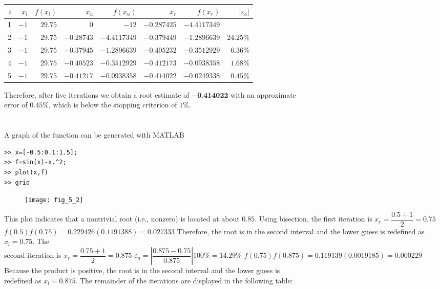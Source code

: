 \documentclass[../main.tex]{subfiles}
\begin{document}
\begin{enumerate}[label=\bfseries(\alph*)]
\begin{tabular}{|r|r|r|r|r|r|r|r|}
\hline
$i$ & $x_{l}$ & $f\left(x_{l}\right)$ & $x_{u}$ & $f\left(x_{u}\right)$ & $x_{r}$ & $f\left(x_{r}\right)$ & $\left|\varepsilon_{a}\right|$ \\
\hline
1 & $-1$ & $29.75$ & 0 & $-12$ & $-0.287425$ & $-4.4117349$ &  \\
\hline
2 & $-1$ & $29.75$ & $-0.28743$ & $-4.4117349$ & $-0.379449$ & $-1.2896639$ & $24.25 \%$ \\
\hline
3 & $-1$ & $29.75$ & $-0.37945$ & $-1.2896639$ & $-0.405232$ & $-0.3512929$ & $6.36 \%$ \\
\hline
4 & $-1$ & $29.75$ & $-0.40523$ & $-0.3512929$ & $-0.412173$ & $-0.0938358$ & $1.68 \%$ \\
\hline
5 & $-1$ & $29.75$ & $-0.41217$ & $-0.0938358$ & $-0.414022$ & $-0.0249338$ & $0.45 \%$ \\
\hline
\end{tabular}
\bigbreak
Therefore, after five iterations we obtain a root estimate of $\mathbf{- 0 . 4 1 4 0 2 2}$ with an approximate \\error of $0.45 \%$, which is below the stopping criterion of $1 \%$.
\bigbreak


\section{}
A graph of the function can be generated with MATLAB
\bigbreak
\begin{lstlisting}[numbers=none]
>> x=[-0.5:0.1:1.5];
>> f=sin(x)-x.^2;
>> plot(x,f)
>> grid
\end{lstlisting}
\bigbreak
\begin{figure}[H]
		\hspace*{1.8cm}\texttt{[image: fig\_5\_2]}
		\label{fig:fig_5_2}
	\end{figure}
\bigbreak

This plot indicates that a nontrivial root (i.e., nonzero) is located at about $0.85$.
\bigbreak
Using bisection, the first iteration is
\bigbreak
$x_{r}=\dfrac{0.5+1}{2}=0.75$
\bigbreak
$f(0.5) f(0.75)=0.229426(0.1191388)=0.027333$
\bigbreak
Therefore, the root is in the second interval and the lower guess is redefined as $x_{l}=0.75$. The\\ second iteration is
\bigbreak
$x_{r}=\dfrac{0.75+1}{2}=0.875$
\bigbreak
$\varepsilon_{a}=\left|\dfrac{0.875-0.75}{0.875}\right| 100 \%=14.29 \%$
\bigbreak
$f(0.75) f(0.875)=0.119139(0.0019185)=0.000229$
\bigbreak
Because the product is positive, the root is in the second interval and the lower guess is\\ redefined as $x_{l}=0.875$. The remainder of the iterations are displayed in the following table:
\bigbreak


\end{enumerate}
\end{document}
